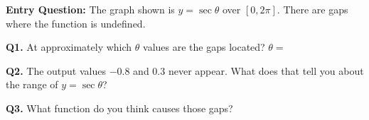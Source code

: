 \documentclass[10pt]{article}
\begin{document}
\vspace{0.08in}

\begin{hookbox}
\textbf{Entry Question:} The graph shown is $y = \sec\theta$ over $[0, 2\pi]$.
There are gaps where the function is undefined.

\vspace{4pt}
\textbf{Q1.} At approximately which $\theta$ values are the gaps located?
$\theta = $ 

\vspace{4pt}
\textbf{Q2.} The output values $-0.8$ and $0.3$ never appear. What does that tell
you about the range of $y = \sec\theta$?

\vspace{4pt}
\textbf{Q3.} What function do you think causes those gaps?
\end{hookbox}

\vspace{0.08in}
\end{document}
